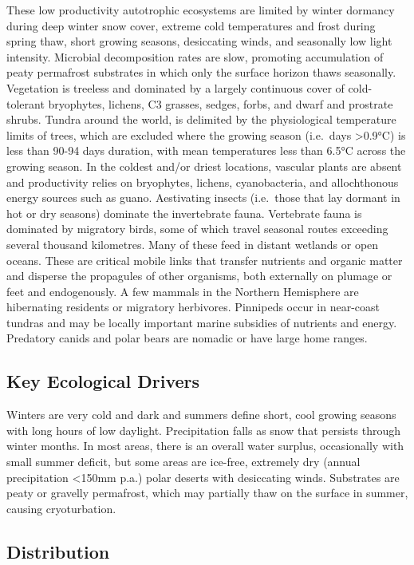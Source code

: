 \documentclass[
  letterpaper,
  DIV=11,
  numbers=noendperiod]{scrartcl}
\begin{document}
These low productivity autotrophic ecosystems are limited by winter
dormancy during deep winter snow cover, extreme cold temperatures and
frost during spring thaw, short growing seasons, desiccating winds, and
seasonally low light intensity. Microbial decomposition rates are slow,
promoting accumulation of peaty permafrost substrates in which only the
surface horizon thaws seasonally. Vegetation is treeless and dominated
by a largely continuous cover of cold-tolerant bryophytes, lichens, C3
grasses, sedges, forbs, and dwarf and prostrate shrubs. Tundra around
the world, is delimited by the physiological temperature limits of
trees, which are excluded where the growing season (i.e.~days
\textgreater0.9°C) is less than 90-94 days duration, with mean
temperatures less than 6.5°C across the growing season. In the coldest
and/or driest locations, vascular plants are absent and productivity
relies on bryophytes, lichens, cyanobacteria, and allochthonous energy
sources such as guano. Aestivating insects (i.e.~those that lay dormant
in hot or dry seasons) dominate the invertebrate fauna. Vertebrate fauna
is dominated by migratory birds, some of which travel seasonal routes
exceeding several thousand kilometres. Many of these feed in distant
wetlands or open oceans. These are critical mobile links that transfer
nutrients and organic matter and disperse the propagules of other
organisms, both externally on plumage or feet and endogenously. A few
mammals in the Northern Hemisphere are hibernating residents or
migratory herbivores. Pinnipeds occur in near-coast tundras and may be
locally important marine subsidies of nutrients and energy. Predatory
canids and polar bears are nomadic or have large home ranges.

\subsection{Key Ecological Drivers}\label{key-ecological-drivers-95}

Winters are very cold and dark and summers define short, cool growing
seasons with long hours of low daylight. Precipitation falls as snow
that persists through winter months. In most areas, there is an overall
water surplus, occasionally with small summer deficit, but some areas
are ice-free, extremely dry (annual precipitation \textless150mm p.a.)
polar deserts with desiccating winds. Substrates are peaty or gravelly
permafrost, which may partially thaw on the surface in summer, causing
cryoturbation.

\subsection{Distribution}\label{distribution-95}
\end{document}
